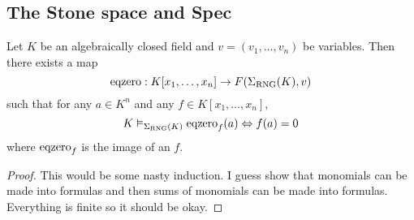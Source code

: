 \subsection{The Stone space and Spec}
\begin{prop}
    Let $K$ be an algebraically closed field
    and $v = (v_1,\dots,v_n)$ be variables.
    Then there exists a map 
    \[\operatorname{eqzero} : K[x_1,\dots,x_n] \to F(\Sigma_{\mathrm{RNG}}(K),v)\]
    such that for any $a \in K^n$ and any $f \in K[x_1,\dots,x_n]$,
    \[K \vDash_{\Sigma_{\mathrm{RNG}}(K)} \operatorname{eqzero}_f(a) \Leftrightarrow f(a) = 0\]
    where $\operatorname{eqzero}_f$ is the image of an $f$.
\end{prop}
\begin{proof}
    This would be some nasty induction.
    I guess show that monomials can be made into formulas 
    and then sums of monomials can be made into formulas.
    Everything is finite so it should be okay.
\end{proof}

